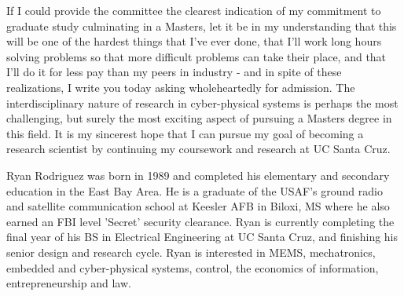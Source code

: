 \documentclass[journal]{IEEEtran}
\begin{document}
If I could provide the committee the clearest indication of my commitment to graduate study culminating in a Masters, let it be in my understanding that this will be one of the hardest things that I've ever done, that I'll work long hours solving problems so that more difficult problems can take their place, and that I'll do it for less pay than my peers in industry - and in spite of these realizations, I write you today asking wholeheartedly for admission. 
The interdisciplinary nature of research in cyber-physical systems is perhaps the most challenging, but surely the most exciting aspect of pursuing a Masters degree in this field. It is my sincerest hope that I can pursue my goal of becoming a research scientist by continuing my coursework and research at UC Santa Cruz.

\begin{IEEEbiography}{Ryan Rodriguez} 
was born in 1989 and completed his elementary and secondary education in the East Bay Area. He is a graduate of the USAF's ground radio and satellite communication school at Keesler AFB in Biloxi, MS where he also earned an FBI level 'Secret' security clearance. Ryan is currently completing the final year of his BS in Electrical Engineering at UC Santa Cruz, and finishing his senior design and research cycle. Ryan is interested in MEMS, mechatronics, embedded and cyber-physical systems, control, the economics of information, entrepreneurship and law. 
\end{IEEEbiography}
\end{document}
